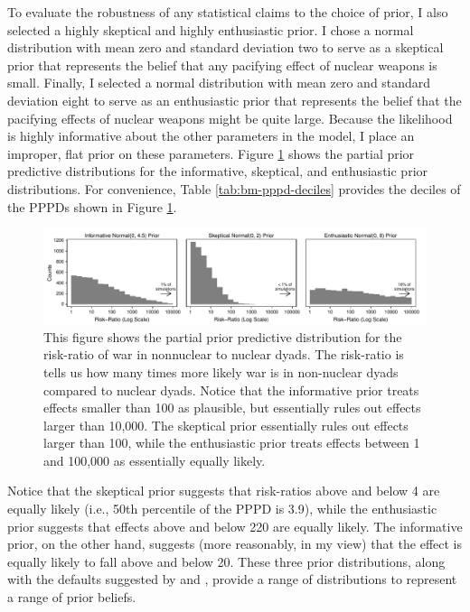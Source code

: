 \documentclass[12pt]{article}
\begin{document}
To evaluate the robustness of any statistical claims to the choice of prior, I also selected a highly skeptical and highly enthusiastic prior. I chose a normal distribution with mean zero and standard deviation two to serve as a skeptical prior that represents the belief that any pacifying effect of nuclear weapons is small. Finally, I selected a normal distribution with mean zero and standard deviation eight to serve as an enthusiastic prior that represents the belief that the pacifying effects of nuclear weapons might be quite large. Because the likelihood is highly informative about the other parameters in the model, I place an improper, flat prior on these parameters. Figure \ref{fig:bm-pppd-hist} shows the partial prior predictive distributions for the informative, skeptical, and enthusiastic prior distributions. For convenience, Table \ref{tab:bm-pppd-deciles} provides the deciles of the PPPDs shown in Figure \ref{fig:bm-pppd-hist}. 

\begin{figure}[H]
\begin{center}
\includegraphics[scale = .8]{figs/bm-pppd-hist.pdf}
\caption{This figure shows the partial prior predictive distribution for the risk-ratio of war in nonnuclear to nuclear dyads. The risk-ratio is tells us how many times more likely war is in non-nuclear dyads compared to nuclear dyads. Notice that the informative prior treats effects smaller than 100 as plausible, but essentially rules out effects larger than 10,000. The skeptical prior essentially rules out effects larger than 100, while the enthusiastic prior treats effects between 1 and 100,000 as essentially equally likely.}\label{fig:bm-pppd-hist}
\end{center}
\end{figure}



Notice that the skeptical prior suggests that risk-ratios above and below 4 are equally likely (i.e., 50th percentile of the PPPD is 3.9), while the enthusiastic prior suggests that effects above and below 220 are equally likely. The informative prior, on the other hand, suggests (more reasonably, in my view) that the effect is equally likely to fall above and below 20. These three prior distributions, along with the defaults suggested by \cite{Zorn2005} and \cite{Gelmanetal2008}, provide a range of distributions to represent a range of prior beliefs.
\end{document}
